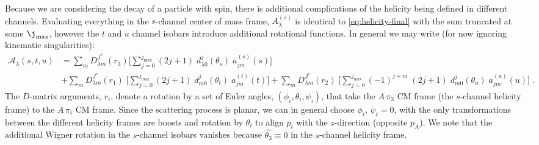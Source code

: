 \documentclass[10pt, aps,prd,amsmath,amssymb,superscriptaddress,onecolumn,
nofootinbib,showpacs,preprintnumbers]{revtex4-1}
\newcommand{\jmax}{{j_\text{max}}}
\begin{document}
 Because we are considering the decay of a particle with spin, there is additional complications of the helicity being defined in different channels. Evaluating everything in the \(s\)-channel center of mass frame, \(A_\lambda^{(s)}\) is identical to \cref{eq:helicity-final} with the sum truncated at some \(\j_\text{max}\), however the \(t\) and \(u\) channel isobars introduce additional rotational functions.
 In general we may write (for now ignoring kinematic singularities):
 \begin{align}
   \label{eq:iso-D-matrix}
    \mathcal{A}_\lambda(s,t,u) &= \sum_{m} D^{J^*}_{\lambda m}(r_3)
    \bigg [
    \sum_{j = 0}^{\jmax} (2j+1) \; d_{\lambda0}^j(\theta_s) \; a_{ j m}^{(s)}(s)
    \bigg ]
     \nonumber \\
    &+ \sum_{m} D^{J^*}_{\lambda m}(r_1) \;
    \bigg[
    \sum_{j = 0}^{\jmax} (2j+1) \;d_{m0}^j (\theta_t) \; a_{j m}^{(t)}(t)
    \bigg]
    + \sum_{m} D^{J^*}_{\lambda m}(r_2) \;
    \bigg[
    \sum_{j = 0}^{\jmax} (-1)^{j + m} \; (2j+1) \;d_{m0}^j(\theta_u) \; a_{j m}^{(u)}(u)
    \bigg] \; .
 \end{align}
 The \(D\)-matrix arguments, \(r_i\), denote a rotation by a set of Euler angles, \((\phi_i,\theta_i,\psi_i)\), that take the \(A \, \pi_3\) CM frame (the \(s\)-channel helicity frame) to the \(A \, \pi_i\) CM frame. Since the scattering process is planar, we can in general choose \(\phi_i, \,\psi_i = 0\), with the only transformations between the different helicity frames are boosts and rotation by \(\theta_i\) to align \(p_i\) with the \(z\)-direction (opposite \(p_A\)). We note that the additional Wigner rotation in the \(s\)-channel isobars vanishes because \(\hat{\theta_3} \equiv 0\)
 in the \(s\)-channel helicity frame.
\end{document}
